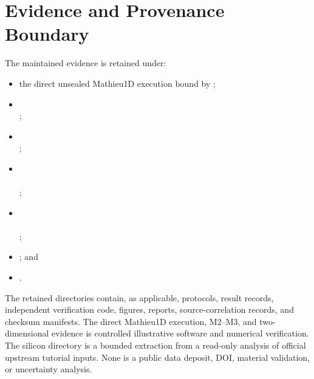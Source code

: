 \section{Evidence and Provenance Boundary}
\label{app:evidence-provenance}

The maintained evidence is retained under:
\begin{itemize}
 \item the direct unsealed Mathieu1D execution bound by
       ;
 \item {}\\
       ;
 \item {}\\
       ;
 \item {}\\
       \\
       ;
 \item {}\\
       \\
       ;
 \item {}; and
 \item {}.
\end{itemize}
The retained directories contain, as applicable, protocols, result records,
independent verification code, figures, reports, source-correlation records, and
checksum manifests. The direct Mathieu1D execution, M2--M3, and two-dimensional evidence is controlled
illustrative software and numerical verification. The silicon directory is a
bounded extraction from a read-only analysis of official upstream tutorial
inputs. None is a public data deposit, DOI, material validation, or uncertainty
analysis.


